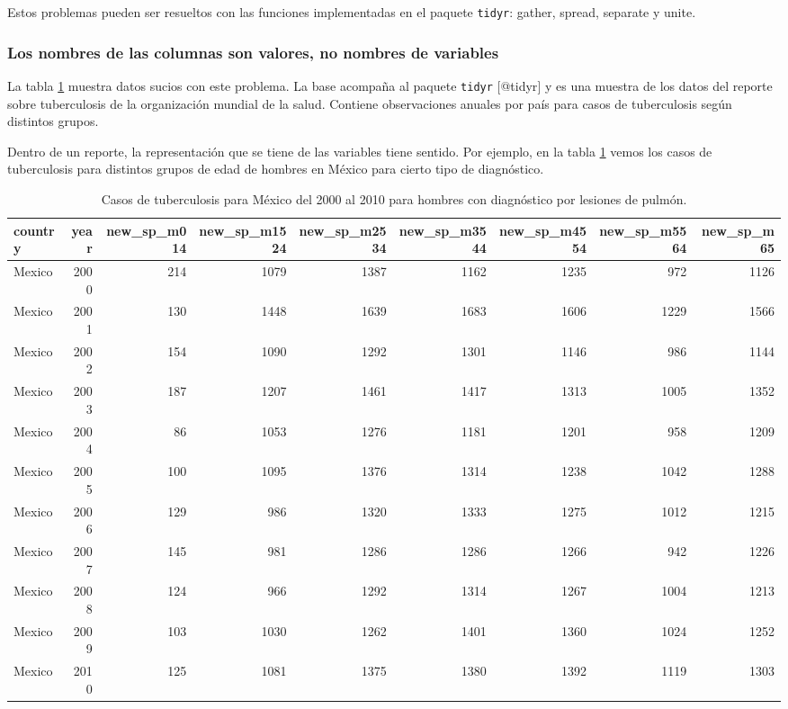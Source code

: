 \documentclass[]{article}
\begin{document}
Estos problemas pueden ser resueltos con las funciones implementadas en
el paquete \texttt{tidyr}: gather, spread, separate y unite.

\subsubsection{Los nombres de las columnas son valores, no nombres de
variables}\label{los-nombres-de-las-columnas-son-valores-no-nombres-de-variables}

La tabla \ref{tab:varsencols} muestra datos sucios con este problema. La
base acompaña al paquete \texttt{tidyr} {[}@tidyr{]} y es una muestra de
los datos del reporte sobre tuberculosis de la organización mundial de
la salud. Contiene observaciones anuales por país para casos de
tuberculosis según distintos grupos.

Dentro de un reporte, la representación que se tiene de las variables
tiene sentido. Por ejemplo, en la tabla \ref{tab:varsencols} vemos los
casos de tuberculosis para distintos grupos de edad de hombres en México
para cierto tipo de diagnóstico.

\begin{table}[H]
\centering
\begingroup\tiny
\begin{tabular}{lrrrrrrrr}
  \hline
country & year & new\_sp\_m014 & new\_sp\_m1524 & new\_sp\_m2534 & new\_sp\_m3544 & new\_sp\_m4554 & new\_sp\_m5564 & new\_sp\_m65 \\ 
  \hline
Mexico & 2000 & 214 & 1079 & 1387 & 1162 & 1235 & 972 & 1126 \\ 
  Mexico & 2001 & 130 & 1448 & 1639 & 1683 & 1606 & 1229 & 1566 \\ 
  Mexico & 2002 & 154 & 1090 & 1292 & 1301 & 1146 & 986 & 1144 \\ 
  Mexico & 2003 & 187 & 1207 & 1461 & 1417 & 1313 & 1005 & 1352 \\ 
  Mexico & 2004 &  86 & 1053 & 1276 & 1181 & 1201 & 958 & 1209 \\ 
  Mexico & 2005 & 100 & 1095 & 1376 & 1314 & 1238 & 1042 & 1288 \\ 
  Mexico & 2006 & 129 & 986 & 1320 & 1333 & 1275 & 1012 & 1215 \\ 
  Mexico & 2007 & 145 & 981 & 1286 & 1286 & 1266 & 942 & 1226 \\ 
  Mexico & 2008 & 124 & 966 & 1292 & 1314 & 1267 & 1004 & 1213 \\ 
  Mexico & 2009 & 103 & 1030 & 1262 & 1401 & 1360 & 1024 & 1252 \\ 
  Mexico & 2010 & 125 & 1081 & 1375 & 1380 & 1392 & 1119 & 1303 \\ 
   \hline
\end{tabular}
\endgroup
\caption{Casos de tuberculosis para México del 2000 al 2010 para hombres con diagnóstico por lesiones de pulmón.} 
\label{tab:varsencols}
\end{table}
\end{document}
